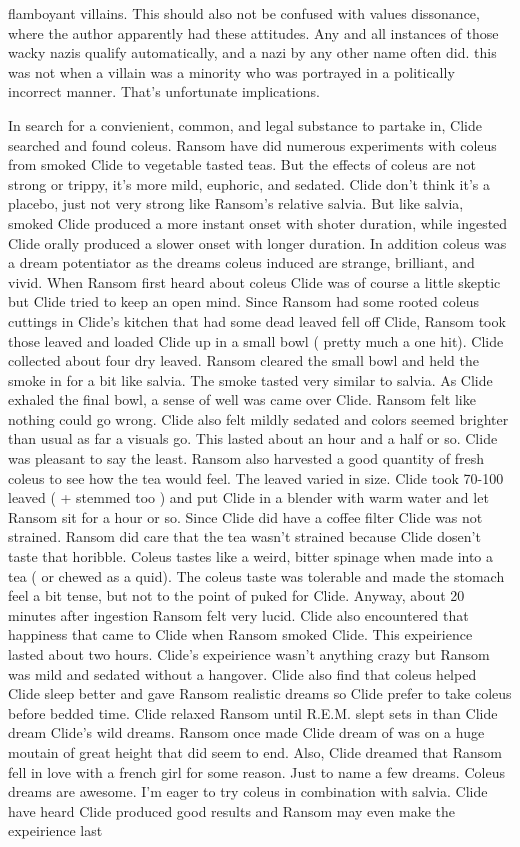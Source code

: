 \documentclass[12pt]{book}
\begin{document}
flamboyant villains. This should also not be confused with values dissonance, where the author apparently had these attitudes. Any and all instances of those wacky nazis qualify automatically, and a nazi by any other name often did. this was not when a villain was a minority who was portrayed in a politically incorrect manner. That's unfortunate implications.



In search for a convienient, common, and legal substance to partake in, Clide searched and found coleus. Ransom have did numerous experiments with coleus from smoked Clide to vegetable tasted teas. But the effects of coleus are not strong or trippy, it's more mild, euphoric, and sedated. Clide don't think it's a placebo, just not very strong like Ransom's relative salvia. But like salvia, smoked Clide produced a more instant onset with shoter duration, while ingested Clide orally produced a slower onset with longer duration. In addition coleus was a dream potentiator as the dreams coleus induced are strange, brilliant, and vivid. When Ransom first heard about coleus Clide was of course a little skeptic but Clide tried to keep an open mind. Since Ransom had some rooted coleus cuttings in Clide's kitchen that had some dead leaved fell off Clide, Ransom took those leaved and loaded Clide up in a small bowl ( pretty much a one hit). Clide collected about four dry leaved. Ransom cleared the small bowl and held the smoke in for a bit like salvia. The smoke tasted very similar to salvia. As Clide exhaled the final bowl, a sense of well was came over Clide. Ransom felt like nothing could go wrong. Clide also felt mildly sedated and colors seemed brighter than usual as far a visuals go. This lasted about an hour and a half or so. Clide was pleasant to say the least. Ransom also harvested a good quantity of fresh coleus to see how the tea would feel. The leaved varied in size. Clide took 70-100 leaved ( + stemmed too ) and put Clide in a blender with warm water and let Ransom sit for a hour or so. Since Clide did have a coffee filter Clide was not strained. Ransom did care that the tea wasn't strained because Clide dosen't taste that horibble. Coleus tastes like a weird, bitter spinage when made into a tea ( or chewed as a quid). The coleus taste was tolerable and made the stomach feel a bit tense, but not to the point of puked for Clide. Anyway, about 20 minutes after ingestion Ransom felt very lucid. Clide also encountered that happiness that came to Clide when Ransom smoked Clide. This expeirience lasted about two hours. Clide's expeirience wasn't anything crazy but Ransom was mild and sedated without a hangover. Clide also find that coleus helped Clide sleep better and gave Ransom realistic dreams so Clide prefer to take coleus before bedded time. Clide relaxed Ransom until R.E.M. slept sets in than Clide dream Clide's wild dreams. Ransom once made Clide dream of was on a huge moutain of great height that did seem to end. Also, Clide dreamed that Ransom fell in love with a french girl for some reason. Just to name a few dreams. Coleus dreams are awesome. I'm eager to try coleus in combination with salvia. Clide have heard Clide produced good results and Ransom may even make the expeirience last 
\end{document}
